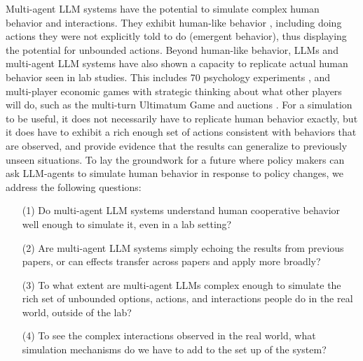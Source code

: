 Multi-agent LLM systems have the potential to simulate complex human behavior and interactions. 
They exhibit human-like behavior \cite{park2023generativeagentsinteractivesimulacra}, including doing actions they were not explicitly told to do (emergent behavior), thus displaying the potential for unbounded actions. 
Beyond human-like behavior, LLMs and multi-agent LLM systems have also shown a capacity to replicate actual human behavior seen in lab studies. This includes 70 psychology experiments \cite{aher2023usinglargelanguagemodels, hewitt2024predicting}, and multi-player economic games with strategic thinking about what other players will do, such as the 
multi-turn Ultimatum Game \cite{sreedhar2024simulatinghumanstrategicbehavior} and auctions \cite{manning2024automated}. 
For a simulation to be useful, it does not necessarily have to replicate human behavior exactly, but it does have to exhibit a rich enough set of actions consistent with behaviors that are observed, and provide evidence that the results can generalize to previously unseen situations.
To lay the groundwork for a future where policy makers can ask LLM-agents to simulate human behavior in response to policy changes, we address the following  questions:
\begin{itemize}
    \item[(1)] Do multi-agent LLM systems understand human cooperative behavior well enough to simulate it, even in a lab setting?
    \item[(2)] Are multi-agent LLM systems simply echoing the results from previous papers, or can effects transfer across papers and apply more broadly?
    \item[(3)] To what extent are multi-agent LLMs complex enough to simulate the rich set of unbounded options, actions, and interactions people do in the real world, outside of the lab? 
    \item[(4)] To see the complex interactions observed in the real world, what simulation mechanisms do we have to add to the set up of the system?
\end{itemize}

